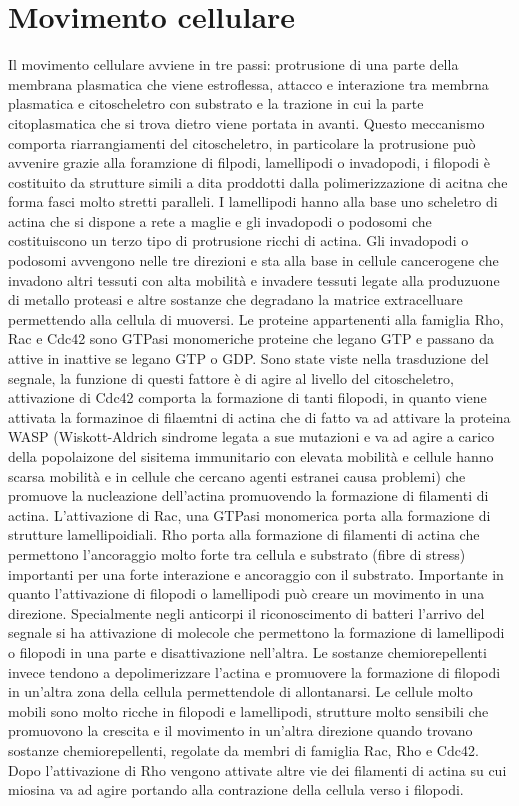 \section{Movimento cellulare}
Il movimento cellulare avviene in tre passi: protrusione di una parte della membrana plasmatica che viene estroflessa, attacco e interazione tra membrna plasmatica e citoscheletro con
substrato e la trazione in cui la parte citoplasmatica che si trova dietro viene portata in avanti. Questo meccanismo comporta riarrangiamenti del citoscheletro, in particolare la
protrusione pu\`o avvenire grazie alla foramzione di filpodi, lamellipodi o invadopodi, i filopodi \`e costituito da strutture simili a dita proddotti dalla polimerizzazione di acitna
che forma fasci molto stretti paralleli. I lamellipodi hanno alla base uno scheletro di actina che si dispone a rete a maglie e gli invadopodi o podosomi che costituiscono un terzo tipo
di protrusione ricchi di actina. Gli invadopodi o podosomi avvengono nelle tre direzioni e sta alla base in cellule cancerogene che invadono altri tessuti con alta mobilit\`a e invadere
tessuti legate alla produzuone di metallo proteasi e altre sostanze che degradano la matrice extracelluare permettendo alla cellula di muoversi. Le proteine appartenenti alla famiglia 
Rho, Rac e Cdc42 sono GTPasi monomeriche proteine che legano GTP e passano da attive in inattive se legano GTP o GDP. Sono state viste nella trasduzione del segnale, la funzione di 
questi fattore \`e di agire al livello del citoscheletro, attivazione di Cdc42 comporta la formazione di tanti filopodi, in quanto viene attivata la formazinoe di filaemtni di actina che
di fatto va ad attivare la proteina WASP (Wiskott-Aldrich sindrome legata a sue mutazioni e va ad agire a carico della popolaizone del sisitema immunitario con elevata mobilit\`a e 
cellule hanno scarsa mobilit\`a e in cellule che cercano agenti estranei causa problemi) che promuove la nucleazione dell'actina promuovendo la formazione di filamenti di actina. 
L'attivazione di Rac, una GTPasi monomerica porta alla formazione di strutture lamellipoidiali. Rho porta alla formazione di filamenti di actina che permettono l'ancoraggio molto forte
tra cellula e substrato (fibre di stress) importanti per una forte interazione e ancoraggio con il substrato. Importante in quanto l'attivazione di filopodi o lamellipodi pu\`o creare
un movimento in una direzione. Specialmente negli anticorpi il riconoscimento di batteri l'arrivo del segnale si ha attivazione di molecole che permettono la formazione di lamellipodi
o filopodi in una parte e disattivazione nell'altra. Le sostanze chemiorepellenti invece tendono a depolimerizzare l'actina e promuovere la formazione di filopodi in un'altra zona della
cellula permettendole di allontanarsi. Le cellule molto mobili sono molto ricche in filopodi e lamellipodi, strutture molto sensibili che promuovono la crescita e il movimento in un'altra
direzione quando trovano sostanze chemiorepellenti, regolate da membri di famiglia Rac, Rho e Cdc42. Dopo l'attivazione di Rho vengono attivate altre vie dei filamenti di actina su 
cui miosina va ad agire portando alla contrazione della cellula verso i filopodi.
